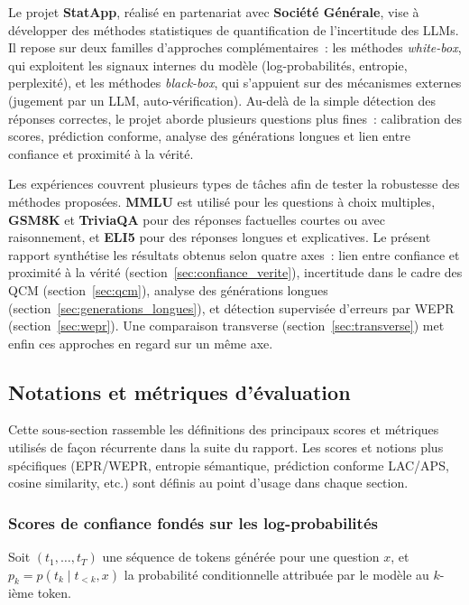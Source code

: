 \documentclass[12pt,a4paper]{article}
\begin{document}
Le projet \textbf{StatApp}, réalisé en partenariat avec \textbf{Société Générale}, vise à développer des méthodes statistiques de quantification de l'incertitude des LLMs. Il repose sur deux familles d'approches complémentaires~: les méthodes \textit{white-box}, qui exploitent les signaux internes du modèle (log-probabilités, entropie, perplexité), et les méthodes \textit{black-box}, qui s'appuient sur des mécanismes externes (jugement par un LLM, auto-vérification). Au-delà de la simple détection des réponses correctes, le projet aborde plusieurs questions plus fines~: calibration des scores, prédiction conforme, analyse des générations longues et lien entre confiance et proximité à la vérité.

Les expériences couvrent plusieurs types de tâches afin de tester la robustesse des méthodes proposées. \textbf{MMLU} est utilisé pour les questions à choix multiples, \textbf{GSM8K} et \textbf{TriviaQA} pour des réponses factuelles courtes ou avec raisonnement, et \textbf{ELI5} pour des réponses longues et explicatives. Le présent rapport synthétise les résultats obtenus selon quatre axes~: lien entre confiance et proximité à la vérité (section~\ref{sec:confiance_verite}), incertitude dans le cadre des QCM (section~\ref{sec:qcm}), analyse des générations longues (section~\ref{sec:generations_longues}), et détection supervisée d'erreurs par WEPR (section~\ref{sec:wepr}). Une comparaison transverse (section~\ref{sec:transverse}) met enfin ces approches en regard sur un même axe.

\subsection{Notations et métriques d'évaluation}
\label{sec:metriques}

Cette sous-section rassemble les définitions des principaux scores et métriques utilisés de façon récurrente dans la suite du rapport. Les scores et notions plus spécifiques (EPR/WEPR, entropie sémantique, prédiction conforme LAC/APS, cosine similarity, etc.) sont définis au point d'usage dans chaque section.

\subsubsection*{Scores de confiance fondés sur les log-probabilités}

Soit $(t_1, \ldots, t_T)$ une séquence de tokens générée pour une question $x$, et $p_k = p(t_k \mid t_{<k}, x)$ la probabilité conditionnelle attribuée par le modèle au $k$-ième token.
\end{document}
